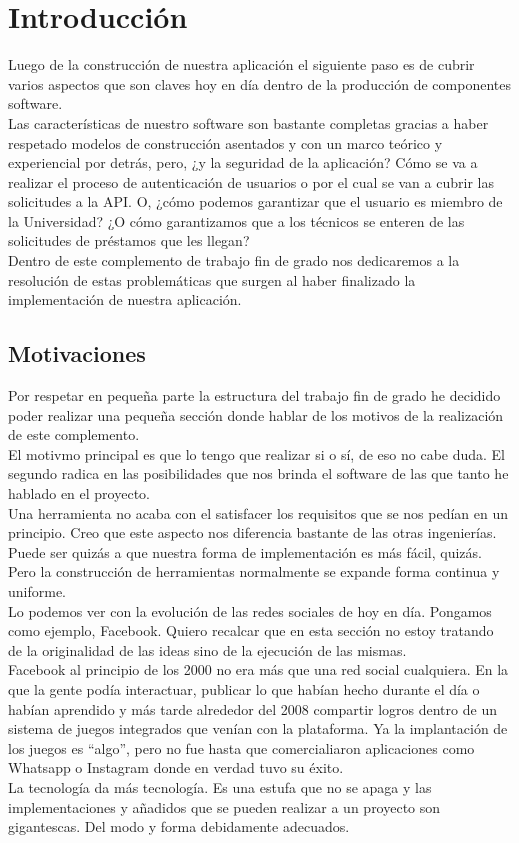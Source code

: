 \chapter{Introducción}
Luego de la construcción de nuestra aplicación el siguiente paso es de cubrir varios aspectos que son claves hoy en día dentro de la producción de componentes software.
\\Las características de nuestro software son bastante completas gracias a haber respetado modelos de construcción asentados y con un marco teórico y experiencial por detrás, pero, ¿y la seguridad de la aplicación? Cómo se va a realizar el proceso de autenticación de usuarios o por el cual se van a cubrir las solicitudes a la API. O, ¿cómo podemos garantizar que el usuario es miembro de la Universidad? ¿O cómo garantizamos que a los técnicos se enteren de las solicitudes de préstamos que les llegan?
\\Dentro de este complemento de trabajo fin de grado nos dedicaremos a la resolución de estas problemáticas que surgen al haber finalizado la implementación de nuestra aplicación.

\section{Motivaciones}
Por respetar en pequeña parte la estructura del trabajo fin de grado he decidido poder realizar una pequeña sección donde hablar de los motivos de la realización de este complemento.
\\El motivmo principal es que lo tengo que realizar si o sí, de eso no cabe duda. El segundo radica en las posibilidades que nos brinda el software de las que tanto he hablado en el proyecto.
\\Una herramienta no acaba con el satisfacer los requisitos que se nos pedían en un principio. Creo que este aspecto nos diferencia bastante de las otras ingenierías. Puede ser quizás a que nuestra forma de implementación es más fácil, quizás. Pero la construcción de herramientas normalmente se expande forma continua y uniforme.
\\Lo podemos ver con la evolución de las redes sociales de hoy en día. Pongamos como ejemplo, Facebook. Quiero recalcar que en esta sección no estoy tratando de la originalidad de las ideas sino de la ejecución de las mismas.
\\Facebook al principio de los 2000 no era más que una red social cualquiera. En la que la gente podía interactuar, publicar lo que habían hecho durante el día o habían aprendido y más tarde alrededor del 2008 compartir logros dentro de un sistema de juegos integrados que venían con la plataforma. Ya la implantación de los juegos es ``algo'', pero no fue hasta que comercialiaron aplicaciones como Whatsapp o Instagram donde en verdad tuvo su éxito.
\\La tecnología da más tecnología. Es una estufa que no se apaga y las implementaciones y añadidos que se pueden realizar a un proyecto son gigantescas. Del modo y forma debidamente adecuados.

